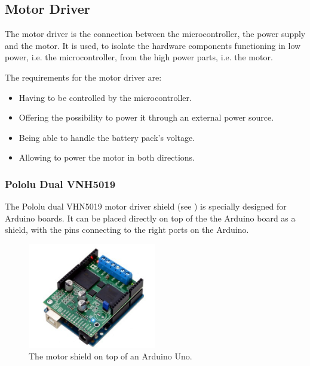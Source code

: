 


\subsection{Motor Driver}
The motor driver is the connection between the microcontroller, the power supply and the motor. It is used, to isolate the hardware components functioning in low power, i.e. the microcontroller, from the high power parts, i.e. the motor.

The requirements for the motor driver are:
\begin{itemize}
\item Having to be controlled by the microcontroller.
\item Offering the possibility to power it through an external power source.
\item Being able to handle the battery pack's voltage.
\item Allowing to power the motor in both directions.
\end{itemize}

\subsubsection{Pololu Dual VNH5019}
The Pololu dual VHN5019 motor driver shield (see ) is specially designed for Arduino boards. It can be placed directly on top of the the Arduino board as a shield, with the pins connecting to the right ports on the Arduino.\cite{PCorporation}

\begin{figure}[H]
	\centering
	\includegraphics[width=0.50\textwidth]{figures/Motordriver.png}
		\caption{The motor shield on top of an Arduino Uno.} 
	\label{MotorDrive}
\end{figure}

